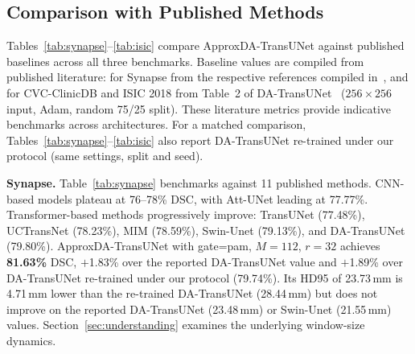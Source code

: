\subsection{Comparison with Published Methods}

Tables~\ref{tab:synapse}--\ref{tab:isic} compare ApproxDA-TransUNet against published baselines across all three benchmarks. Baseline values are compiled from published literature: for Synapse from the respective references compiled in~\cite{sun2024datransunet}, and for CVC-ClinicDB and ISIC 2018 from Table~2 of DA-TransUNet~\cite{sun2024datransunet} ($256{\times}256$ input, Adam, random 75/25 split). These literature metrics provide indicative benchmarks across architectures. For a matched comparison, Tables~\ref{tab:synapse}--\ref{tab:isic} also report DA-TransUNet re-trained under our protocol (same settings, split and seed).

\textbf{Synapse.} Table~\ref{tab:synapse} benchmarks against 11 published methods. CNN-based models plateau at 76--78\% DSC, with Att-UNet leading at 77.77\%. Transformer-based methods progressively improve: TransUNet (77.48\%), UCTransNet (78.23\%), MIM (78.59\%), Swin-Unet (79.13\%), and DA-TransUNet (79.80\%). ApproxDA-TransUNet with gate=pam, $M{=}112$, $r{=}32$ achieves \textbf{81.63\%} DSC, $+$1.83\% over the reported DA-TransUNet value and $+$1.89\% over DA-TransUNet re-trained under our protocol (79.74\%). Its HD95 of 23.73\,mm is 4.71\,mm lower than the re-trained DA-TransUNet (28.44\,mm) but does not improve on the reported DA-TransUNet (23.48\,mm) or Swin-Unet (21.55\,mm) values. Section~\ref{sec:understanding} examines the underlying window-size dynamics.

